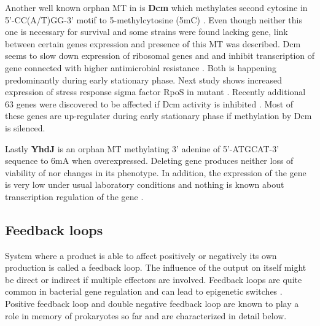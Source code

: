 Another well known orphan MT in  is \textbf{Dcm} which methylates second cytosine in 5'-CC(A/T)GG-3' motif to 5-methylcytosine (5mC) \cite{marinus1973isolation}.
Even though neither this one is necessary for  survival and some strains were found lacking  gene, link between certain genes expression and presence of this MT was described.
Dcm seems to slow down expression of ribosomal genes  and  and inhibit transcription of  gene connected with higher antimicrobial resistance \cite{militello2012conservation, militello2014cytosine}.
Both is happening predominantly during early stationary phase.
Next study shows increased expression of stress response sigma factor RpoS in  mutant \cite{kahramanoglou2012genomics}.
Recently additional 63 genes were discovered to be affected if Dcm activity is inhibited \cite{militello20165}.
Most of these genes are up-regulater during early stationary phase if methylation by Dcm is silenced.

Lastly \textbf{YhdJ} is an orphan MT methylating 3' adenine of 5'-ATGCAT-3' sequence to 6mA when overexpressed.
Deleting  gene produces neither loss of viability of  nor changes in its phenotype.
In addition, the expression of the gene is very low under usual laboratory conditions and nothing is known about transcription regulation of the gene \cite{broadbent2007yhdj}.

\subsection{Feedback loops}
System where a product is able to affect positively or negatively its own production is called a feedback loop.
The influence of the output on itself might be direct or indirect if multiple effectors are involved.
Feedback loops are quite common in bacterial gene regulation and can lead to epigenetic switches \cite{smits2006phenotypic, veening2008bistability}.
Positive feedback loop and double negative feedback loop are known to play a role in memory of prokaryotes so far and are characterized in detail below.

